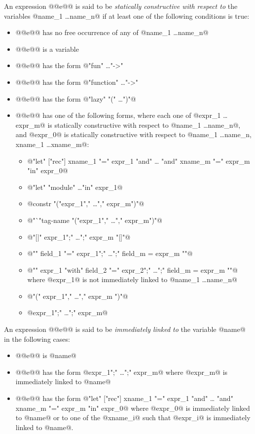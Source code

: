 An expression @@e@@ is said to be {\em statically constructive
with respect to} the variables @name_1 \ldots name_n@ if at least
one of the following conditions is true:
\begin{itemize}
\item @@e@@ has no free occurrence of any of @name_1 \ldots name_n@
\item @@e@@ is a variable
\item @@e@@ has the form @"fun" \ldots "->" \ldots@
\item @@e@@ has the form @"function" \ldots "->" \ldots@
\item @@e@@ has the form @"lazy" "(" \ldots ")"@
\item @@e@@ has one of the following forms, where each one of
  @expr_1 \ldots expr_m@ is statically constructive with respect to
  @name_1 \ldots name_n@, and @expr_0@ is statically constructive with
  respect to @name_1 \ldots name_n, xname_1 \ldots xname_m@:
  \begin{itemize}
  \item @"let" ["rec"] xname_1 "=" expr_1 "and" \ldots
         "and" xname_m "=" expr_m "in" expr_0@
  \item @"let" "module" \ldots "in" expr_1@
  \item @constr "("expr_1"," \ldots "," expr_m")"@
  \item @"`"tag-name "("expr_1"," \ldots "," expr_m")"@
  \item @"[|" expr_1";" \ldots ";" expr_m "|]"@
  \item @"{" field_1 "=" expr_1";" \ldots ";" field_m = expr_m "}"@
  \item @"{" expr_1 "with" field_2 "=" expr_2";" \ldots ";"
             field_m = expr_m "}"@ where @expr_1@ is not immediately
             linked to @name_1 \ldots name_n@
  \item @"(" expr_1"," \ldots "," expr_m ")"@
  \item @expr_1";" \ldots ";" expr_m@
  \end{itemize}
\end{itemize}

An expression @@e@@ is said to be {\em immediately linked to} the variable
@name@ in the following cases:
\begin{itemize}
\item @@e@@ is @name@
\item @@e@@ has the form @expr_1";" \ldots ";" expr_m@ where @expr_m@
   is immediately linked to @name@
\item @@e@@ has the form @"let" ["rec"] xname_1 "=" expr_1 "and" \ldots
   "and" xname_m "=" expr_m "in" expr_0@ where @expr_0@ is immediately
   linked to @name@ or to one of the @xname_i@ such that @expr_i@
   is immediately linked to @name@.
\end{itemize}

